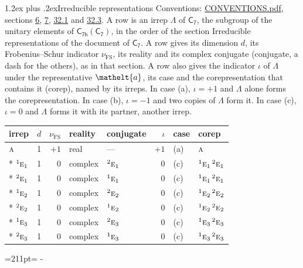 \documentclass[10pt,a4paper]{article}
\makeatletter
\renewcommand\section{\@startsection{section}{1}{\z@}{-3ex plus -1ex minus -.2ex}%
  {1.2ex plus .2ex}{\normalfont\large\sffamily\bfseries\color{parttitle}}}
\newcommand{\needspace}[1]{\par\penalty-100\begingroup\dimen0=#1\relax\dimen2=\pagegoal
  \advance\dimen2-\pagetotal\ifdim\dimen0>\dimen2\relax\ifdim\dimen2>0pt\vfil\break\fi\fi
  \endgroup}
\numberwithin{equation}{section}
\newcommand{\eltfont}[1]{{\let\sigma\eltsigma\mathelt{#1}}}
\newcommand{\grp}[1]{\mathsf{#1}}
\newcommand{\irr}[1]{\text{\normalfont\scshape #1}}
\newcommand{\conjpair}[1]{{}^{#1}}
\newcommand{\elt}[1]{\eltfont{#1}}
\newcommand{\fsind}{\nu_{\mathrm{FS}}}
\makeatother
\begin{document}
\section{Irreducible representations}\label{s:irreps}
Conventions: \href{../../CONVENTIONS.pdf}{CONVENTIONS.pdf}, sections \href{../../../rotation/CONVENTIONS.pdf\#conv.6}{6}, \href{../../../rotation/CONVENTIONS.pdf\#conv.7}{7}, \href{../../CONVENTIONS.pdf\#conv.32.1}{32.1} and \href{../../CONVENTIONS.pdf\#conv.32.3}{32.3}.
\leavevmode\label{n:irrep.Delta}A row is an irrep $\Lambda$ of $\grp{C_{7}}$, the subgroup of the unitary elements of $\grp{C_{7h}}(\grp{C_{7}})$, in the order of the section Irreducible representations of the document of \href{../../../rotation/data/pdf/C7.pdf}{$\grp{C_{7}}$}. \label{n:index.dimension}\label{n:index.frobenius}\label{n:head.irrep}\label{n:head.reality}\label{n:head.conjugate}A row gives its dimension $d$, its Frobenius--Schur indicator $\fsind$, its reality and its complex conjugate (conjugate, a dash for the others), as in that section. \label{n:head.case.corep}\label{n:head.corep}A row also gives the indicator $\iota$ of $\Lambda$ under the representative $\elt{a}$, its case and the corepresentation that contains it (corep), named by its irreps. In case (a), $\iota = +1$ and $\Lambda$ alone forms the corepresentation. In case (b), $\iota = -1$ and two copies of $\Lambda$ form it. In case (c), $\iota = 0$ and $\Lambda$ forms it with its partner, another irrep.
\setlength{\emergencystretch}{2em}\par\setlength{\emergencystretch}{0pt}
{\small\renewcommand{\arraystretch}{1.25}\setlength{\tabcolsep}{4pt}\begin{longtable}{@{}lrrllrll@{}}\toprule
irrep & $d$ & $\fsind$ & reality & conjugate & $\iota$ & case & corep\\\midrule\endhead
\bottomrule\endfoot\endlastfoot
$\irr{a}$ & 1 & $+1$ & real & --- & $+1$ & (a) & $\irr{a}$\\*
$\conjpair{1}\irr{e}_{1}$ & 1 & $0$ & complex & $\conjpair{2}\irr{e}_{1}$ & $0$ & (c) & $\conjpair{1}\irr{e}_{1}\,\conjpair{2}\irr{e}_{1}$\\*
$\conjpair{2}\irr{e}_{1}$ & 1 & $0$ & complex & $\conjpair{1}\irr{e}_{1}$ & $0$ & (c) & $\conjpair{1}\irr{e}_{1}\,\conjpair{2}\irr{e}_{1}$\\*
$\conjpair{1}\irr{e}_{2}$ & 1 & $0$ & complex & $\conjpair{2}\irr{e}_{2}$ & $0$ & (c) & $\conjpair{1}\irr{e}_{2}\,\conjpair{2}\irr{e}_{2}$\\*
$\conjpair{2}\irr{e}_{2}$ & 1 & $0$ & complex & $\conjpair{1}\irr{e}_{2}$ & $0$ & (c) & $\conjpair{1}\irr{e}_{2}\,\conjpair{2}\irr{e}_{2}$\\*
$\conjpair{1}\irr{e}_{3}$ & 1 & $0$ & complex & $\conjpair{2}\irr{e}_{3}$ & $0$ & (c) & $\conjpair{1}\irr{e}_{3}\,\conjpair{2}\irr{e}_{3}$\\*
$\conjpair{2}\irr{e}_{3}$ & 1 & $0$ & complex & $\conjpair{1}\irr{e}_{3}$ & $0$ & (c) & $\conjpair{1}\irr{e}_{3}\,\conjpair{2}\irr{e}_{3}$\\
\bottomrule\end{longtable}}
\needspace{211pt}
\end{document}
